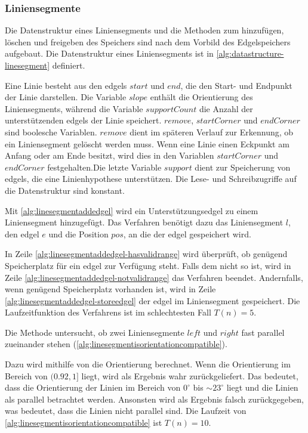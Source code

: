 \subsubsection{Liniensegmente} %
\label{sub:datenstruktur-liniensegmente}

Die Datenstruktur eines Liniensegments und die Methoden zum hinzufügen, löschen und freigeben des Speichers sind nach
 dem Vorbild des Edgelspeichers aufgebaut. Die Datenstruktur eines Liniensegments ist in
 \autoref{alg:datastructure-linesegment} definiert.

Eine Linie besteht aus den \glspl{edgel} $\mathit{start}$ und $\mathit{end}$, die den Start- und Endpunkt der Linie
 darstellen. Die Variable $\mathit{slope}$ enthält die Orientierung des Liniensegments, während die Variable
 $\mathit{supportCount}$ die Anzahl der unterstützenden \glspl{edgel} der Linie speichert. $\mathit{remove}$,
 $\mathit{startCorner}$ und $\mathit{endCorner}$ sind boolesche Variablen. $\mathit{remove}$ dient im späteren Verlauf
 zur Erkennung, ob ein Liniensegment gelöscht werden muss. Wenn eine Linie einen Eckpunkt am Anfang oder am Ende
 besitzt, wird dies in den Variablen $\mathit{startCorner}$ und $\mathit{endCorner}$ festgehalten.Die letzte Variable
 $\mathit{support}$ dient zur Speicherung von \glspl{edgel}, die eine Linienhypothese unterstützen. Die Lese- und
 Schreibzugriffe auf die Datenstruktur sind konstant.

Mit \autoref{alg:linesegmentaddedgel} wird ein Unterstützungsedgel zu einem Liniensegment hinzugefügt. Das Verfahren
 benötigt dazu das Liniensegment $l$, den \gls{edgel} $e$ und die Position $\mathit{pos}$, an die der \gls{edgel}
 gespeichert wird.

In Zeile \ref{alg:linesegmentaddedgel-hasvalidrange} wird überprüft, ob genügend Speicherplatz für ein \gls{edgel} zur
 Verfügung steht. Falls dem nicht so ist, wird in Zeile \ref{alg:linesegmentaddedgel-notvalidrange} das Verfahren
 beendet. Andernfalls, wenn genügend Speicherplatz vorhanden ist, wird in Zeile
 \ref{alg:linesegmentaddedgel-storeedgel} der \gls{edgel} im Liniensegment gespeichert. Die Laufzeitfunktion des
 Verfahrens ist im schlechtesten Fall $T(n) = 5$.

Die Methode  untersucht, ob zwei Liniensegmente $\mathit{left}$ und $\mathit{right}$
 fast parallel zueinander stehen (\autoref{alg:linesegmentisorientationcompatible}).

Dazu wird mithilfe von  die Orientierung berechnet. Wenn die Orientierung im Bereich von
 $(0.92,1]$ liegt, wird als Ergebnis wahr zurückgeliefert. Das bedeutet, dass die Orientierung der Linien im Bereich
 von $0^\circ$ bis $\sim 23^\circ$ liegt und die Linien als parallel betrachtet werden. Ansonsten wird als Ergebnis
 falsch zurückgegeben, was bedeutet, dass die Linien nicht parallel sind. Die Laufzeit von
 \autoref{alg:linesegmentisorientationcompatible} ist $T(n) = 10$.

